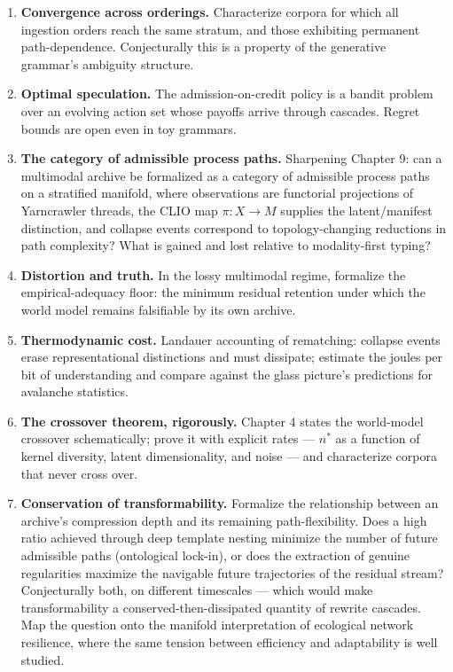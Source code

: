 \documentclass[11pt,oneside]{book}
\theoremstyle{remark}
\begin{document}
\begin{enumerate}[leftmargin=2em]
\item \textbf{Convergence across orderings.} Characterize corpora for
which all ingestion orders reach the same stratum, and those exhibiting
permanent path-dependence. Conjecturally this is a property of the
generative grammar's ambiguity structure.
\item \textbf{Optimal speculation.} The admission-on-credit policy is a
bandit problem over an evolving action set whose payoffs arrive through
cascades. Regret bounds are open even in toy grammars.
\item \textbf{The category of admissible process paths.} Sharpening
Chapter 9: can a multimodal archive be formalized as a category of
admissible process paths on a stratified manifold, where observations
are functorial projections of Yarncrawler threads, the CLIO map
$\pi : X \to M$ supplies the latent/manifest distinction, and collapse
events correspond to topology-changing reductions in path complexity?
What is gained and lost relative to modality-first typing?
\item \textbf{Distortion and truth.} In the lossy multimodal regime,
formalize the empirical-adequacy floor: the minimum residual retention
under which the world model remains falsifiable by its own archive.
\item \textbf{Thermodynamic cost.} Landauer accounting of rematching:
collapse events erase representational distinctions and must dissipate;
estimate the joules per bit of understanding and compare against the
glass picture's predictions for avalanche statistics.
\item \textbf{The crossover theorem, rigorously.} Chapter 4 states the
world-model crossover schematically; prove it with explicit rates ---
$n^\ast$ as a function of kernel diversity, latent dimensionality, and
noise --- and characterize corpora that never cross over.
\item \textbf{Conservation of transformability.} Formalize the
relationship between an archive's compression depth and its remaining
path-flexibility. Does a high ratio achieved through deep template
nesting minimize the number of future admissible paths (ontological
lock-in), or does the extraction of genuine regularities maximize the
navigable future trajectories of the residual stream? Conjecturally
both, on different timescales --- which would make transformability a
conserved-then-dissipated quantity of rewrite cascades. Map the
question onto the manifold interpretation of ecological network
resilience, where the same tension between efficiency and adaptability
is well studied.
\end{enumerate}
\end{document}
